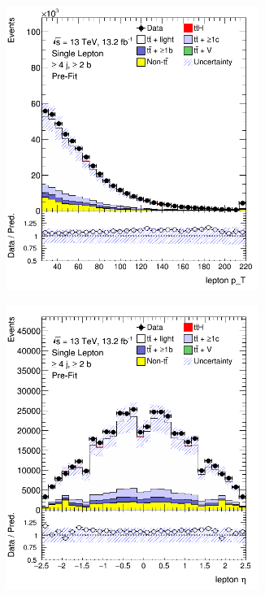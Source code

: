 \begin{figure}[p]
\begin{subfigure}{0.33\textwidth}
  \caption{}
  \label{}
\end{subfigure}
\begin{subfigure}{0.33\textwidth}
  \centering
  \includegraphics[width=0.9\textwidth]{figures/ttH/presel/ljets_leptonPt_ge4jge2b.png}
  \caption{}
  \label{}
\end{subfigure}
\begin{subfigure}{0.33\textwidth}
  \centering
  \includegraphics[width=0.9\textwidth]{figures/ttH/presel/ljets_leptonEta_ge4jge2b.png}

\end{subfigure}
\end{figure}

